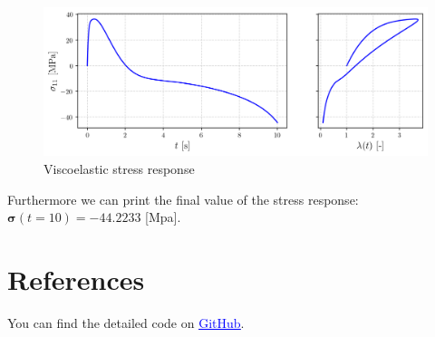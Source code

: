 \documentclass[12pt,a4paper]{article}
\begin{document}
\begin{figure}[H]
    \centering
    \includegraphics[scale=0.8]{figures/stress.png}
    \caption{Viscoelastic stress response}
    \label{fig:stress}
\end{figure}

Furthermore we can print the final value of the stress response: $\boldsymbol{\sigma}(t=10) = -44.2233$ [Mpa].


\section*{References}

You can find the detailed code on \href{https://github.com/zsoca000/Finite-elastic-deformations-HW1/blob/main/solution2.ipynb}{\textcolor{blue}{\underline{GitHub}}}.
\end{document}
